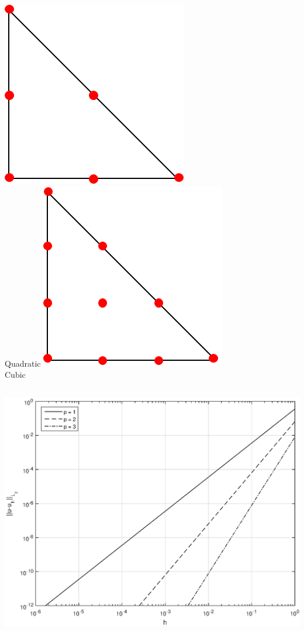 \documentclass[compress,10pt]{beamer}
\begin{document}
\begin{frame}[t]
{\begin{columns}
\centering
{}\includegraphics[width=0.75\columnwidth]{images/ref_tri_dofs_k2.png} \\
Quadratic
\centering
{}\includegraphics[width=0.75\columnwidth]{images/ref_tri_dofs_k3.png} \\
Cubic
\end{columns}
}
{
{}\includegraphics[width=0.45\columnwidth]{images/hConverge.eps} \hspace*{1mm}
}
\end{frame}
\end{document}

